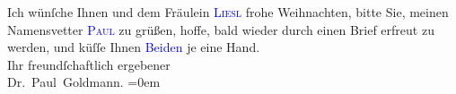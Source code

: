 \pstart
           Ich wünſche Ihnen und dem Fräulein \textsc{\textcolor{blue}{Liesl}{}\ledrightnote{\textcolor{blue}{Elisabeth Steinrück}}} frohe Weihnachten, bitte Sie, meinen
               Namensvetter \textsc{\textcolor{blue}{Paul}{}\ledrightnote{\textcolor{blue}{Paul Marx}}} zu grüßen, hoffe, bald wieder durch einen Brief erfreut zu werden, und küſſe
               Ihnen \textcolor{blue}{Beiden}{}\ledrightnote{{$\rightarrow$}\textcolor{blue}{Elisabeth Steinrück}} je eine Hand.
               {\\[\baselineskip]}Ihr freundſchaftlich ergebener {\\[\baselineskip]}\spacefill\mbox{Dr. Paul Goldmann.}\pend
           \leftskip=0em{}\endnumbering{}  
      
